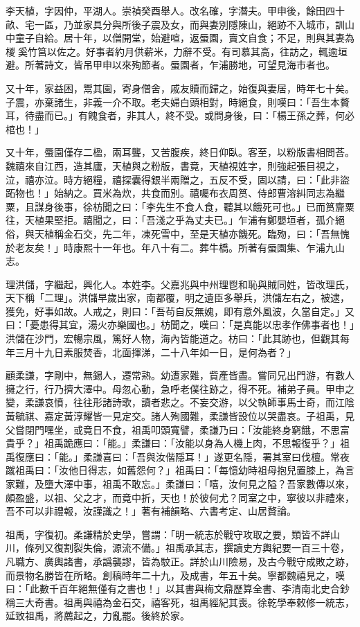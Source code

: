 \begin{pinyinscope}
李天植，字因仲，平湖人。崇禎癸酉舉人。改名確，字潛夫。甲申後，餘田四十畝、宅一區，乃並家具分與所後子震及女，而與妻別隱陳山，絕跡不入城市，訓山中童子自給。居十年，以僧開堂，始避喧，返蜃園，賣文自食；不足，則與其妻為椶奚竹筥以佐之。好事者約月供薪米，力辭不受。有司慕其高，往訪之，輒逾垣避。所著詩文，皆吊甲申以來殉節者。蜃園者，乍浦勝地，可望見海市者也。

又十年，家益困，鬻其園，寄身僧舍，戚友贖而歸之，始復與妻居，時年七十矣。子震，亦棄諸生，非義一介不取。老夫婦白頭相對，時絕食，則嘆曰：「吾生本贅耳，待盡而已。」有餽食者，非其人，終不受。或問身後，曰：「楊王孫之葬，何必棺也！」

又十年，蜃園僅存二楹，兩耳聾，又苦腹疾，終日仰臥。客至，以粉版書相問荅。魏禧來自江西，造其廬，天植與之粉版，書竟，天植視姓字，則強起張目視之，泣，禧亦泣。時方絕糧，禧探囊得銀半兩贈之，五反不受，固以請，曰：「此非盜跖物也！」始納之。買米為炊，共食而別。禧囑布衣周筼、侍郎曹溶糾同志為繼粟，且謀身後事，徐枋聞之曰：「李先生不食人食，聽其以餓死可也。」已而筼齎粟往，天植果堅拒。禧聞之，曰：「吾淺之乎為丈夫已。」乍浦有鄭嬰垣者，孤介絕俗，與天植稱金石交，先二年，凍死雪中，至是天植亦饑死。臨歾，曰：「吾無愧於老友矣！」時康熙十一年也。年八十有二。葬牛橋。所著有蜃園集、乍浦九山志。

理洪儲，字繼起，興化人。本姓李。父嘉兆與中州理鬯和恥與賊同姓，皆改理氏，天下稱「二理」。洪儲早歲出家，南都覆，明之遺臣多舉兵，洪儲左右之，被逮，獲免，好事如故。人戒之，則曰：「吾茍自反無媿，即有意外風波，久當自定。」又曰：「憂患得其宜，湯火亦樂國也。」枋聞之，嘆曰：「是真能以忠孝作佛事者也！」洪儲在沙門，宏暢宗風，篤好人物，海內皆能道之。枋曰：「此其跡也，但觀其每年三月十九日素服焚香，北面揮涕，二十八年如一日，是何為者？」

顧柔謙，字剛中，無錫人，遷常熟。幼遭家難，貲產皆盡。嘗同兄出門游，有數人擁之行，行乃擠大澤中。母忽心動，急呼老僕往跡之，得不死。補弟子員。甲申之變，柔謙哀憤，往往形諸詩歌，讀者悲之。不妄交游，以父執師事馬士奇，而江陰黃毓祺、嘉定黃淳耀皆一見定交。諸人殉國難，柔謙皆設位以哭盡哀。子祖禹，見父嘗閉門嘿坐，或竟日不食，祖禹叩頭寬譬，柔謙乃曰：「汝能終身窮餓，不思富貴乎？」祖禹跪應曰：「能。」柔謙曰：「汝能以身為人機上肉，不思報復乎？」祖禹復應曰：「能。」柔謙喜曰：「吾與汝偕隱耳！」遂更名隱，署其室曰伐檀。常夜蹴祖禹曰：「汝他日得志，如舊怨何？」祖禹曰：「每憶幼時祖母抱兒置膝上，為言家難，及墮大澤中事，祖禹不敢忘。」柔謙曰：「嘻，汝何見之隘？吾家數傳以來，頗盈盛，以祖、父之才，而竟中折，天也！於彼何尤？同室之中，寧彼以非禮來，吾不可以非禮報，汝謹識之！」著有補韻略、六書考定、山居贅論。

祖禹，字復初。柔謙精於史學，嘗謂：「明一統志於戰守攻取之要，類皆不詳山川，條列又復割裂失倫，源流不備。」祖禹承其志，撰讀史方輿紀要一百三十卷，凡職方、廣輿諸書，承譌襲謬，皆為駮正。詳於山川險易，及古今戰守成敗之跡，而景物名勝皆在所略。創稿時年二十九，及成書，年五十矣。寧都魏禧見之，嘆曰：「此數千百年絕無僅有之書也！」以其書與梅文鼎歷算全書、李清南北史合鈔稱三大奇書。祖禹與禧為金石交，禧客死，祖禹經紀其喪。徐乾學奉敕修一統志，延致祖禹，將薦起之，力亂罷。後終於家。


\end{pinyinscope}
